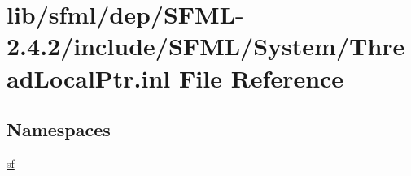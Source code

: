 \hypertarget{sfml_2dep_2_s_f_m_l-2_84_82_2include_2_s_f_m_l_2_system_2_thread_local_ptr_8inl}{\section{lib/sfml/dep/\-S\-F\-M\-L-\/2.4.2/include/\-S\-F\-M\-L/\-System/\-Thread\-Local\-Ptr.inl File Reference}
\label{sfml_2dep_2_s_f_m_l-2_84_82_2include_2_s_f_m_l_2_system_2_thread_local_ptr_8inl}
}
\subsection*{Namespaces}
\begin{DoxyCompactItemize}
\item 
\hyperlink{namespacesf}{sf}
\end{DoxyCompactItemize}
